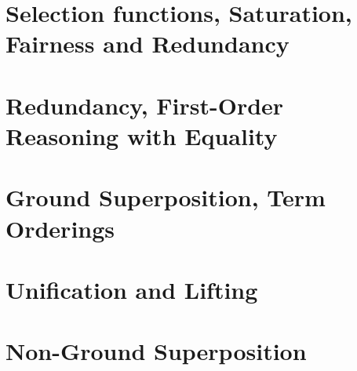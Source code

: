 \documentclass[]{article}
\begin{document}
\section{Selection functions, Saturation, Fairness and Redundancy}

\section{Redundancy, First-Order Reasoning with Equality}

\section{Ground Superposition, Term Orderings}

\section{Unification and Lifting}

\section{Non-Ground Superposition}
\end{document}
